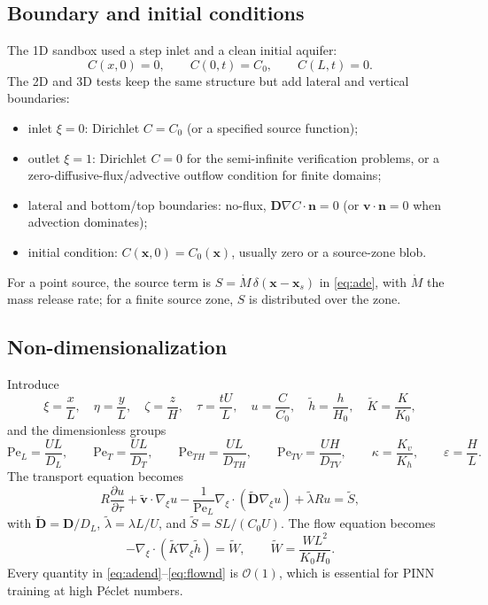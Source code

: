 \documentclass[11pt]{article}
\newcommand{\pdd}[2]{\frac{\partial #1}{\partial #2}}
\newcommand{\Pe}{\mathrm{Pe}}
\newcommand{\DD}{\mathbf{D}}
\newcommand{\vv}{\mathbf{v}}
\newcommand{\xx}{\mathbf{x}}
\newcommand{\nn}{\mathbf{n}}
\begin{document}
\subsection{Boundary and initial conditions}

The 1D sandbox used a step inlet and a clean initial aquifer:
\begin{equation}
\label{eq:icbc1d}
C(x,0)=0,\qquad C(0,t)=C_0,\qquad C(L,t)=0.
\end{equation}
The 2D and 3D tests keep the same structure but add lateral and vertical
boundaries:
\begin{itemize}[leftmargin=1.6em,itemsep=2pt]
  \item inlet $\xi=0$: Dirichlet $C=C_0$ (or a specified source function);
  \item outlet $\xi=1$: Dirichlet $C=0$ for the semi-infinite verification
        problems, or a zero-diffusive-flux/advective outflow condition for
        finite domains;
  \item lateral and bottom/top boundaries: no-flux,
        $\DD\nabla C\cdot\nn=0$ (or $\vv\cdot\nn=0$ when advection dominates);
  \item initial condition: $C(\xx,0)=C_0(\xx)$, usually zero or a source-zone
        blob.
\end{itemize}
For a point source, the source term is
$S=\dot M\,\delta(\xx-\xx_s)$ in \eqref{eq:ade}, with $\dot M$ the mass release
rate; for a finite source zone, $S$ is distributed over the zone.

\subsection{Non-dimensionalization}

Introduce
\begin{equation}
\label{eq:nondim}
\xi=\frac{x}{L},\quad \eta=\frac{y}{L},\quad \zeta=\frac{z}{H},\quad
\tau=\frac{tU}{L},\quad u=\frac{C}{C_0},\quad
\tilde h=\frac{h}{H_0},\quad \tilde K=\frac{K}{K_0},
\end{equation}
and the dimensionless groups
\begin{equation}
\label{eq:groups}
\Pe_L=\frac{UL}{D_L},\qquad
\Pe_T=\frac{UL}{D_T},\qquad
\Pe_{TH}=\frac{UL}{D_{TH}},\qquad
\Pe_{TV}=\frac{UH}{D_{TV}},\qquad
\kappa=\frac{K_v}{K_h},\qquad
\varepsilon=\frac{H}{L}.
\end{equation}
The transport equation becomes
\begin{equation}
\label{eq:adend}
R\pdd{u}{\tau}+\tilde{\vv}\cdot\nabla_{\xi}u
-\frac{1}{\Pe_L}\nabla_{\xi}\cdot(\tilde{\DD}\nabla_{\xi}u)
+\tilde\lambda R u=\tilde S,
\end{equation}
with $\tilde{\DD}=\DD/D_L$, $\tilde\lambda=\lambda L/U$, and
$\tilde S=SL/(C_0U)$.  The flow equation becomes
\begin{equation}
\label{eq:flownd}
-\nabla_{\xi}\cdot(\tilde K\nabla_{\xi}\tilde h)=\tilde W,
\qquad
\tilde W=\frac{WL^2}{K_0H_0}.
\end{equation}
Every quantity in \eqref{eq:adend}--\eqref{eq:flownd} is $\mathcal{O}(1)$,
which is essential for PINN training at high P\'eclet numbers.
\end{document}
